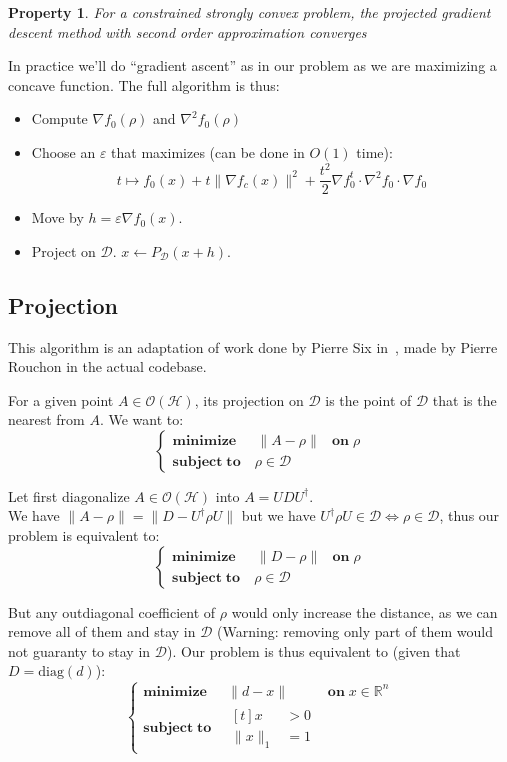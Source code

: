 \documentclass[10pt,a4paper]{report}
\theoremstyle{plain}
\newtheorem{prop}[thm]{Property}
\theoremstyle{definition}
\theoremstyle{remark}
\newcommand{\R}{\ensuremath{\mathbb{R}}}
\newcommand{\minim}[3]{\begin{cases}
    \mathbf{minimize}\;\,\quad #1& \mathbf{on}\; #2\\
    \mathbf{subject\;to}\quad #3
  \end{cases}}
\newcommand{\minima}[3]{\begin{cases}
    \mathbf{minimize}\;\,\quad #1& \mathbf{on}\; #2\\
    \mathbf{subject\;to}\quad \begin{aligned}[t]#3\end{aligned}
  \end{cases}}
\begin{document}
\begin{prop}
  For a constrained strongly convex problem, the projected gradient descent
  method with second order approximation converges
\end{prop}
In practice we'll do ``gradient ascent'' as in our problem as we are maximizing a
concave function. The full algorithm is thus:

\begin{itemize}
\item Compute $\nabla f_0(\rho)$ and $\nabla^2 f_0(\rho)$
\item Choose an $\varepsilon$ that maximizes (can be done in $O(1)$ time):
  \[t \mapsto f_0(x) + t\|\nabla f_c(x)\|^2 + \frac {t^2} 2 \nabla f_0^t \cdot
  \nabla^2\!f_0 \cdot \nabla f_0\]
\item Move by $h = \varepsilon \nabla f_0(x)$.
\item Project on $\mathcal{D}$. $x \leftarrow P_\mathcal{D}(x+h)$.
\end{itemize}

\subsection{Projection}\label{ssec:proj}

This algorithm is an adaptation of work done by Pierre Six in~\cite{SPHD16},
made by Pierre Rouchon in the actual codebase.

For a given point $A \in \mathcal{O}(\mathcal{H})$, its projection on
$\mathcal{D}$ is the point of $\mathcal{D}$ that is the nearest from $A$. We
want to:
\[\minim{\|A - \rho\|}{\rho}{\rho \in \mathcal{D}}\]

Let first diagonalize $A \in \mathcal{O}(\mathcal{H})$ into $A = UDU^\dagger$.\\
We have $\|A - \rho\| = \|D - U^\dagger \rho U\|$ but we have
$U^\dagger \rho U \in \mathcal{D}\iff
\rho \in \mathcal{D}$, thus our problem is equivalent to:
\[\minim{\|D - \rho\|}{\rho}{\rho \in \mathcal{D}}\]

But any outdiagonal coefficient of $\rho$ would only increase the distance, as
we can remove all of them and stay in $\mathcal{D}$ (Warning: removing only part of them
would not guaranty to stay in $\mathcal{D}$). Our problem is thus equivalent to
(given that $D = \mathrm{diag}(d)$):
\[\minima{\|d - x\|}{x \in\R^n}{ x&>0\\ \|x\|_1 &= 1}\]
\end{document}
